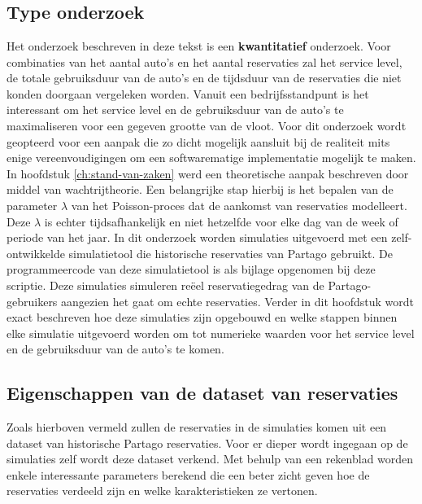 
\chapter{}
\label{ch:methodologie}

\section{Type onderzoek}
Het onderzoek beschreven in deze tekst is een \textbf{kwantitatief} onderzoek. Voor combinaties van het aantal auto's en het aantal reservaties zal het service level, de totale gebruiksduur van de auto's en de tijdsduur van de reservaties die niet konden doorgaan vergeleken worden. Vanuit een bedrijfsstandpunt is het interessant om het service level en de gebruiksduur van de auto's te maximaliseren voor een gegeven grootte van de vloot. Voor dit onderzoek wordt geopteerd voor een aanpak die zo dicht mogelijk aansluit bij de realiteit mits enige vereenvoudigingen om een softwarematige implementatie mogelijk te maken. In hoofdstuk \ref{ch:stand-van-zaken} werd een theoretische aanpak beschreven door middel van wachtrijtheorie. Een belangrijke stap hierbij is het bepalen van de parameter $\lambda$ van het Poisson-proces dat de aankomst van reservaties modelleert. Deze $\lambda$ is echter tijdsafhankelijk en niet hetzelfde voor elke dag van de week of periode van het jaar. In dit onderzoek worden simulaties uitgevoerd met een zelf-ontwikkelde simulatietool die historische reservaties van Partago gebruikt. De programmeercode van deze simulatietool is als bijlage opgenomen bij deze scriptie. Deze simulaties simuleren reëel reservatiegedrag van de Partago-gebruikers aangezien het gaat om echte reservaties. Verder in dit hoofdstuk wordt exact beschreven hoe deze simulaties zijn opgebouwd en welke stappen binnen elke simulatie uitgevoerd worden om tot numerieke waarden voor het service level en de gebruiksduur van de auto's te komen. 

\section{Eigenschappen van de dataset van reservaties} \label{eigenschappen-dataset}
Zoals hierboven vermeld zullen de reservaties in de simulaties komen uit een dataset van historische Partago reservaties. Voor er dieper wordt ingegaan op de simulaties zelf wordt deze dataset verkend. Met behulp van een rekenblad worden enkele interessante parameters berekend die een beter zicht geven hoe de reservaties verdeeld zijn en welke karakteristieken ze vertonen. 
